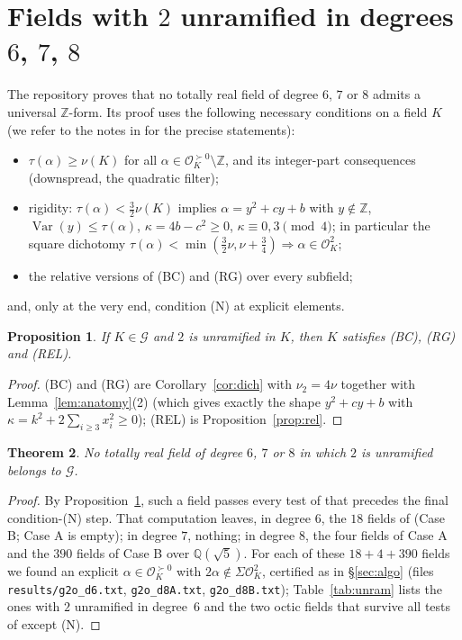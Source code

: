 \documentclass[11pt,reqno]{amsart}
\theoremstyle{plain}
\newtheorem{theorem}{Theorem}[section]
\newtheorem{proposition}[theorem]{Proposition}
\theoremstyle{definition}
\newcommand{\Z}{\mathbb{Z}}
\newcommand{\Q}{\mathbb{Q}}
\newcommand{\OK}{\mathcal{O}_K}
\newcommand{\Gcl}{\mathcal{G}}
\newcommand{\SoS}{\Sigma\OK^{2}}
\newcommand{\tp}{\succ 0}
\DeclareMathOperator{\Var}{Var}
\begin{document}
\section{Fields with $2$ unramified in degrees $6$, $7$, $8$}\label{sec:unram}

The repository \cite{TwoO} proves that no totally real field of degree $6$, $7$ or $8$ admits a
universal $\Z$-form. Its proof uses the following necessary conditions on a field $K$ (we refer to
the notes in \cite{TwoO} for the precise statements):
\begin{itemize}
\item[(BC)] $\tau(\alpha)\ge\nu(K)$ for all $\alpha\in\OK^{\tp}\setminus\Z$, and its integer-part
consequences (downspread, the quadratic filter);
\item[(RG)] rigidity: $\tau(\alpha)<\frac32\nu(K)$ implies $\alpha=y^{2}+cy+b$ with $y\notin\Z$,
$\Var(y)\le\tau(\alpha)$, $\kappa=4b-c^{2}\ge0$, $\kappa\equiv0,3\pmod4$; in particular the square
dichotomy $\tau(\alpha)<\min(\frac32\nu,\nu+\frac34)\Rightarrow\alpha\in\OK^{2}$;
\item[(REL)] the relative versions of (BC) and (RG) over every subfield;
\end{itemize}
and, only at the very end, condition (N) at explicit elements.

\begin{proposition}\label{prop:transfer}
If $K\in\Gcl$ and $2$ is unramified in $K$, then $K$ satisfies (BC), (RG) and (REL).
\end{proposition}

\begin{proof}
(BC) and (RG) are Corollary~\ref{cor:dich} with $\nu_2=4\nu$ together with
Lemma~\ref{lem:anatomy}(2) (which gives exactly the shape $y^{2}+cy+b$ with
$\kappa=k^{2}+2\sum_{i\ge3}x_i^{2}\ge0$); (REL) is Proposition~\ref{prop:rel}.
\end{proof}

\begin{theorem}\label{thm:unram}
No totally real field of degree $6$, $7$ or $8$ in which $2$ is unramified belongs to $\Gcl$.
\end{theorem}

\begin{proof}
By Proposition~\ref{prop:transfer}, such a field passes every test of \cite{TwoO} that precedes
the final condition-(N) step. That computation leaves, in degree $6$, the $18$ fields of
\cite[degree-$6$ Case B]{TwoO} (Case B; Case A is empty); in degree $7$, nothing; in degree $8$, the four
fields of Case A and the $390$ fields of Case B over $\Q(\sqrt5)$. For each of these
$18+4+390$ fields we found an explicit $\alpha\in\OK^{\tp}$ with $2\alpha\notin\SoS$, certified as
in \S\ref{sec:algo} (files \texttt{results/g2o\_d6.txt}, \texttt{g2o\_d8A.txt},
\texttt{g2o\_d8B.txt}); Table~\ref{tab:unram} lists the ones with $2$ unramified in degree~$6$ and
the two octic fields that survive all tests of \cite{TwoO} except (N).
\end{proof}
\end{document}
